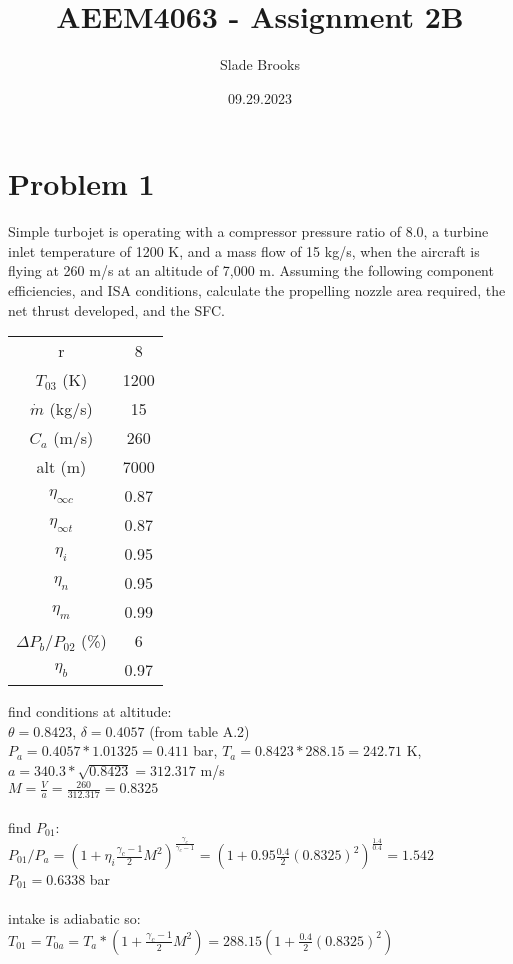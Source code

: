 \documentclass{article}
\title{AEEM4063 - Assignment 2B}
\author{Slade Brooks}
\date{09.29.2023}
\begin{document}
\maketitle

\section*{Problem 1}
Simple turbojet is operating with a compressor pressure ratio of 8.0, a turbine
inlet temperature of 1200 K, and a mass flow of 15 kg/s, when the aircraft is flying at 260
m/s at an altitude of 7,000 m. Assuming the following component efficiencies, and ISA
conditions, calculate the propelling nozzle area required, the net thrust developed, and
the SFC.
\begin{center}
\begin{tabular}{cc}
    r & 8 \\
    $T_{03}$ (K) & 1200 \\
    $\dot{m}$ (kg/s) & 15 \\
    $C_a$ (m/s) & 260 \\
    alt (m) & 7000 \\
    $\eta_{\infty c}$ & 0.87 \\
    $\eta_{\infty t}$ & 0.87 \\
    $\eta_i$ & 0.95 \\
    $\eta_n$ & 0.95 \\
    $\eta_m$ & 0.99 \\
    $\Delta P_b/P_{02}$ (\%) & 6 \\
    $\eta_b$ & 0.97
\end{tabular}
\end{center}
find conditions at altitude: \\
$\theta=0.8423$, $\delta=0.4057$ (from table A.2) \\
$P_a=0.4057*1.01325=0.411$ bar, $T_a=0.8423*288.15=242.71$ K, $a=340.3*\sqrt{0.8423}=312.317$ m/s \\
$M=\frac{V}{a}=\frac{260}{312.317}=0.8325$ \\\\
find $P_{01}$: \\
$P_{01}/P_a=(1+\eta_i\frac{\gamma_c-1}{2}M^2)^\frac{\gamma_c}{\gamma_c-1}=
(1+0.95\frac{0.4}{2}(0.8325)^2)^\frac{1.4}{0.4}=1.542$ \\
$P_{01}=0.6338$ bar \\\\
intake is adiabatic so: $T_{01}=T_{0a}=T_a*(1+\frac{\gamma_c-1}{2}M^2)=
288.15(1+\frac{0.4}{2}(0.8325)^2)$ \\
\end{document}
